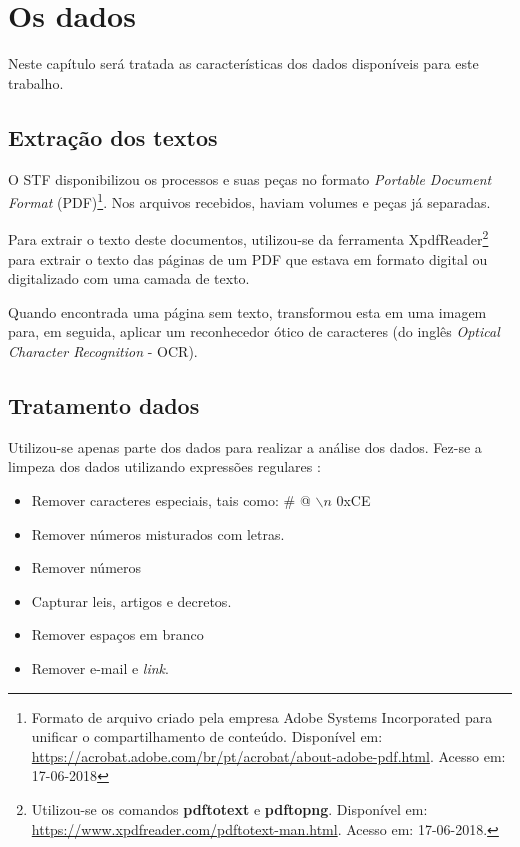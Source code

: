 \chapter[Os dados]{Os dados}

Neste capítulo será tratada as características dos dados disponíveis para este trabalho.

\section{Extração dos textos}

O STF disponibilizou os processos e suas peças no formato \textit{Portable Document Format} (PDF)\footnote{Formato de arquivo criado pela empresa Adobe Systems Incorporated para unificar o compartilhamento de conteúdo. Disponível em: \url{https://acrobat.adobe.com/br/pt/acrobat/about-adobe-pdf.html}. Acesso em: 17-06-2018}. Nos arquivos recebidos, haviam volumes e peças já separadas.

Para extrair o texto deste documentos, utilizou-se da ferramenta XpdfReader\footnote{Utilizou-se os comandos \textbf{pdftotext} e \textbf{pdftopng}. Disponível em: \url{https://www.xpdfreader.com/pdftotext-man.html}. Acesso em: 17-06-2018.} para extrair o texto das páginas de um PDF que estava em formato digital ou digitalizado com uma camada de texto.

Quando encontrada uma página sem texto, transformou esta em uma imagem para, em seguida, aplicar um reconhecedor ótico de caracteres (do inglês \textit{Optical Character Recognition} - OCR).

\section{Tratamento dados}

Utilizou-se apenas parte dos dados para realizar a análise dos dados. Fez-se a limpeza dos dados utilizando expressões regulares \cite{GOYUAERTS2012}:

\begin{itemize}
	\item Remover caracteres especiais, tais como: \# @ $\backslash n$ 0xCE
    \item Remover números misturados com letras.
    \item Remover números
    \item Capturar leis, artigos e decretos.
    \item Remover espaços em branco
    \item Remover e-mail e \textit{link}.
\end{itemize}

